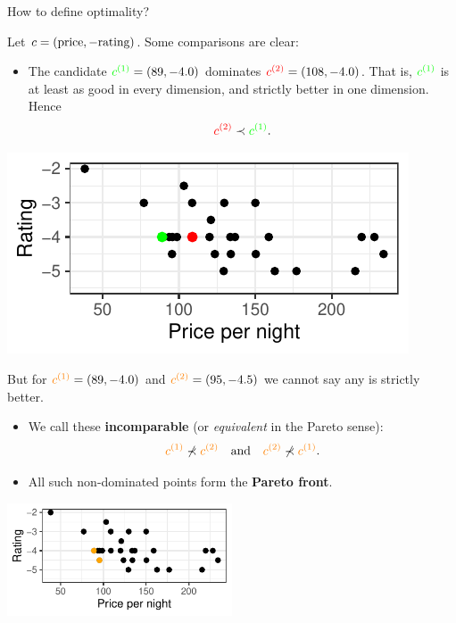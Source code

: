 \documentclass[11pt,compress,t,notes=noshow,xcolor=table]{beamer}
\begin{document}
\begin{vbframe}{How to define optimality?}

Let \(c = (\text{price}, -\text{rating})\). Some comparisons are clear:

\bigskip
\begin{itemize}
  \item The candidate 
        \(\textcolor{green}{c^{(1)}}=(89,-4.0)\)
        dominates 
        \(\textcolor{red}{c^{(2)}}=(108,-4.0)\). 
        That is, \(\textcolor{green}{c^{(1)}}\) is at least as good 
        in every dimension, and strictly better in one dimension.
        Hence 
\[
\textcolor{red}{c^{(2)}} \prec \textcolor{green}{c^{(1)}}.
\]
\end{itemize}

\begin{center}
\includegraphics[width=0.5\linewidth]{slides/11-multicrit/figure_man/expedia-3-1.pdf}
\end{center}

\framebreak

{\small
But for
\(\textcolor{orange}{c^{(1)}}=(89,-4.0)\) 
and 
\(\textcolor{orange}{c^{(2)}}=(95,-4.5)\)
we cannot say any is strictly better.

\bigskip
\begin{itemize}\setlength{\itemsep}{0.1em}
  \item We call these \textbf{incomparable} (or \emph{equivalent} in the Pareto sense):
\[
\textcolor{orange}{c^{(1)}} 
   \not\prec 
\textcolor{orange}{c^{(2)}} 
\quad\text{and}\quad
\textcolor{orange}{c^{(2)}} 
   \not\prec 
\textcolor{orange}{c^{(1)}}.
\]
\item All such non-dominated points form the \textbf{Pareto front}.
\end{itemize}
}

\begin{center}
\includegraphics[width=0.5\textwidth]{slides/11-multicrit/figure_man/expedia-4-1.pdf}



\end{center}
\end{vbframe}
\end{document}
